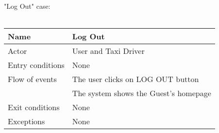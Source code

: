 \newpage

"Log Out" case:
\\
\\
\begin{tabular}{|l|p{10cm}|} 
\hline
Name & Log Out\\
\hline
Actor & User and Taxi Driver\\
\hline
Entry conditions & None\\
\hline
Flow of events
			&	\tabitem The user clicks on LOG OUT button\\
			&	\tabitem The system shows the Guest's homepage\\	
\hline
Exit conditions & None\\
\hline
Exceptions & None\\
\hline
\end {tabular}




